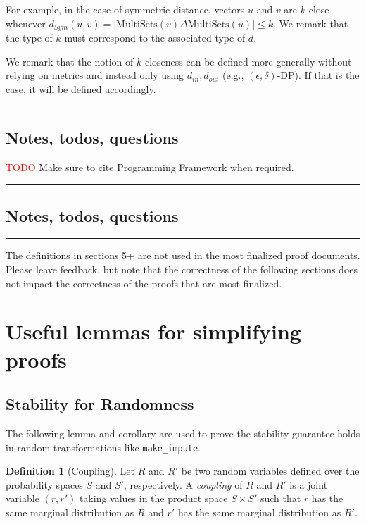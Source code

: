 \documentclass[11pt,a4paper]{article}
\theoremstyle{definition}
\newtheorem{definition}[theorem]{Definition}
\newcommand{\horizline}{\noindent\rule{\textwidth}{1pt}}
\newcommand{\din}{d_{in}}
\newcommand{\dout}{d_{out}}
\newcommand{\grace}[1]{{ {\color{purple}{(grace)~#1}}}}
\newcommand{\todo}{{\textcolor{red}{TODO }}}
\begin{document}
For example, in the case of symmetric distance, vectors $u$ and $v$ are $k$-close whenever $d_{Sym}(u, v) = |\textrm{MultiSets}(v) \Delta \textrm{MultiSets}(u)| \leq k$. We remark that the type of $k$ must correspond to the associated type of $d$.

We remark that the notion of $k$-closeness can be defined more generally without relying on metrics and instead only using $\din, \dout$ (e.g., $(\epsilon, \delta)$-DP). If that is the case, it will be defined accordingly.

\horizline

\subsection{Notes, todos, questions}

\todo{Make sure to cite Programming Framework when required.}

\horizline

\subsection{Notes, todos, questions}

\horizline

{\Large\color{red} The definitions in sections 5+ are not used in the most finalized proof documents. Please leave feedback, but note that the correctness of the following sections does not impact the correctness of the proofs that are most finalized.}

\section{Useful lemmas for simplifying proofs}

\subsection{Stability for Randomness}

The following lemma and corollary are used to prove the stability guarantee holds in random transformations like \texttt{make\_impute}. 

\begin{definition}[Coupling]
Let $R$ and $R'$ be two random variables defined over the probability spaces $S$ and $S'$, respectively. A \emph{coupling} of $R$ and $R'$ is a joint variable $(r, r')$ taking values in the product space $S \times S'$ such that $r$ has the same marginal distribution as $R$ and $r'$ has the same marginal distribution as $R'.$
\end{definition}
\grace{Taken from Jayshree's paper on Theil-Sen estimator.}
\end{document}
